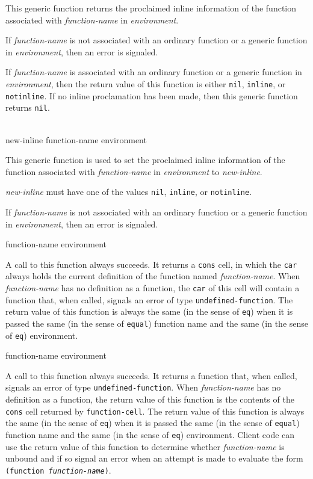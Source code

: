 This generic function returns the proclaimed inline information of the
function associated with \textit{function-name} in
\textit{environment}.

If \textit{function-name} is not associated with an ordinary function
or a generic function in \textit{environment}, then an error is
signaled.

If \textit{function-name} is associated with an ordinary function or a
generic function in \textit{environment}, then the return value of
this function is either \texttt{nil}, \texttt{inline}, or
\texttt{notinline}.  If no inline proclamation has been made, then
this generic function returns \texttt{nil}.

\\
{new-inline function-name environment}

This generic function is used to set the proclaimed inline information
of the function associated with \textit{function-name} in
\textit{environment} to \textit{new-inline}.

\textit{new-inline} must have one of the values \texttt{nil},
\texttt{inline}, or \texttt{notinline}.

If \textit{function-name} is not associated with an ordinary function
or a generic function in \textit{environment}, then an error is
signaled.

 {function-name environment}

A call to this function always succeeds.  It returns a \texttt{cons}
cell, in which the \texttt{car} always holds the current definition of
the function named \textit{function-name}.  When
\textit{function-name} has no definition as a function, the
\texttt{car} of this cell will contain a function that, when called,
signals an error of type \texttt{undefined-function}.  The return
value of this function is always the same (in the sense of
\texttt{eq}) when it is passed the same (in the sense of
\texttt{equal}) function name and the same (in the sense of
\texttt{eq}) environment.

 {function-name environment}

A call to this function always succeeds.  It returns a function that,
when called, signals an error of type \texttt{undefined-function}.
When \textit{function-name} has no definition as a function, the
return value of this function is the contents of the \texttt{cons}
cell returned by \texttt{function-cell}.  The return value of this
function is always the same (in the sense of \texttt{eq}) when it is
passed the same (in the sense of \texttt{equal}) function name and the
same (in the sense of \texttt{eq}) environment.  Client code can use
the return value of this function to determine whether
\textit{function-name} is unbound and if so signal an error when an
attempt is made to evaluate the form \texttt{(function
  \textrm{\textit{function-name}})}.

